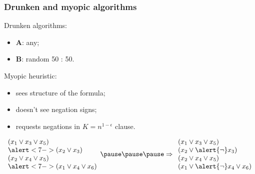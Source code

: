 \begin{frame}
	\frametitle{Drunken and myopic algorithms}
    \pause

    \begin{definition}
        Drunken algorithms:
        \begin{itemize}
	        \item $\mathbf{A}$: any;
	        \item $\mathbf{B}$: random  50 : 50.
        \end{itemize}
    \end{definition}

    \pause
    \begin{definition}
        Myopic heuristic:
        \pause
        \begin{itemize}
	        \item sees structure of the formula;
        	\pause
        	\item doesn't see negation signs;
        	\item<6-> requests negations in $K = n^{1 - \epsilon}$ clause.
        \end{itemize}
    \end{definition}

    \pause
    $\begin{array}{l}
        (x_1 \vee x_3 \vee x_5) \\
        \alert<7->{(x_2 \vee x_3)} \\
        (x_2 \vee x_4 \vee x_5) \\
        \alert<7->{(x_1 \vee x_4 \vee x_6)} \\
    \end{array}
    \pause
    \pause
    \pause
    \Rightarrow
    \begin{array}{l}
        (x_1 \vee x_3 \vee x_5) \\
        (x_2 \vee \alert{\neg} x_3) \\
        (x_2 \vee x_4 \vee x_5) \\
        (x_1 \vee \alert{\neg} x_4 \vee x_6) \\
    \end{array}$
    
\end{frame}

